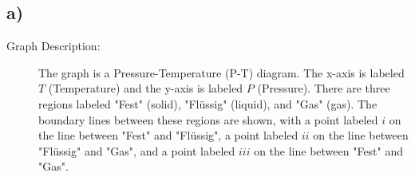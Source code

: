 

\subsection*{a)}

\begin{description}
    \item[Graph Description:] The graph is a Pressure-Temperature (P-T) diagram. The x-axis is labeled \( T \) (Temperature) and the y-axis is labeled \( P \) (Pressure). There are three regions labeled "Fest" (solid), "Flüssig" (liquid), and "Gas" (gas). The boundary lines between these regions are shown, with a point labeled \( i \) on the line between "Fest" and "Flüssig", a point labeled \( ii \) on the line between "Flüssig" and "Gas", and a point labeled \( iii \) on the line between "Fest" and "Gas".
\end{description}